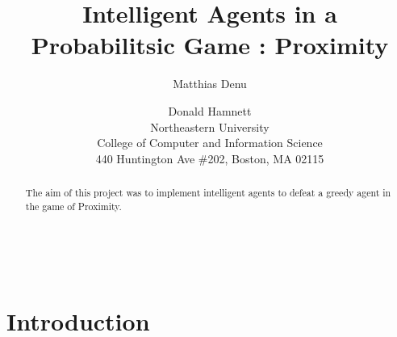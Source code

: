 \documentclass[letterpaper]{article}
\begin{document}
\setlength{pdfpagewidth}{8.5in}
\setlength{pdfpageheight}{11in}\\
%
%
%

\title{Intelligent Agents in a Probabilitsic Game : Proximity}
\author{Matthias Denu \and Donald Hamnett\\ 
Northeastern University \\ College of Computer and Information Science\\ 440 Huntington Ave \#202, Boston, MA 02115}

\maketitle 
\begin{abstract}
\par
The aim of this project was to implement intelligent agents to defeat a greedy agent in the game of Proximity.
\end{abstract}
\section{Introduction}
\par
\end{document}
